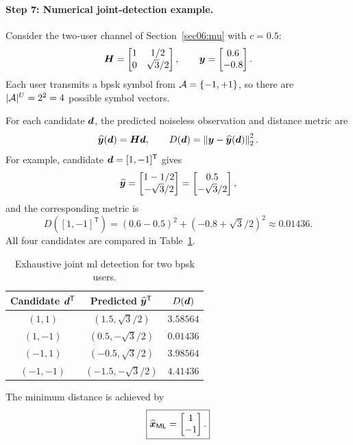 \paragraph{Step 7: Numerical joint-detection example.}
Consider the two-user channel of Section~\ref{sec06:mu} with $c=0.5$:
\begin{equation*}
	\bm{H}=
	\begin{bmatrix}
		1&1/2\\
		0&\sqrt3/2
	\end{bmatrix},
	\qquad
	\bm{y}=
	\begin{bmatrix}0.6\\-0.8\end{bmatrix}.
\end{equation*}
Each user transmits a \ac{bpsk} symbol from $\mathcal{A}=\{-1,+1\}$, so there are $|\mathcal{A}|^U=2^2=4$ possible symbol vectors.

For each candidate $\bm{d}$, the predicted noiseless observation and distance metric are
\begin{equation*}
	\widehat{\bm{y}}(\bm{d})=\bm{H}\bm{d},
	\qquad
	D(\bm{d})=\left\|\bm{y}-\widehat{\bm{y}}(\bm{d})\right\|_2^2.
\end{equation*}
For example, candidate $\bm{d}=[1,-1]^{\mathsf T}$ gives
\begin{equation*}
	\widehat{\bm{y}}=
	\begin{bmatrix}1-1/2\\-\sqrt3/2\end{bmatrix}
	=\begin{bmatrix}0.5\\-\sqrt3/2\end{bmatrix},
\end{equation*}
and the corresponding metric is
\begin{equation*}
	D([1,-1]^{\mathsf T})
	=(0.6-0.5)^2+(-0.8+\sqrt3/2)^2
	\approx0.01436.
\end{equation*}
All four candidates are compared in Table~\ref{tab06:ml-comparison}.
\begin{table}[htbp]
	\centering
	\caption{Exhaustive joint \ac{ml} detection for two \ac{bpsk} users.}
	\label{tab06:ml-comparison}
	\begin{tabular}{ccc}
		\toprule
		Candidate ${\bm{d}}^{\mathsf{T}}$ & Predicted ${\widehat{\bm{y}}}^{\mathsf{T}}$ & $D(\bm{d})$\\
		\midrule
		$(1,1)$ & $(1.5,\sqrt3/2)$ & $3.58564$\\
		$(1,-1)$ & $(0.5,-\sqrt3/2)$ & $0.01436$\\
		$(-1,1)$ & $(-0.5,\sqrt3/2)$ & $3.98564$\\
		$(-1,-1)$ & $(-1.5,-\sqrt3/2)$ & $4.41436$\\
		\bottomrule
	\end{tabular}
\end{table}
The minimum distance is achieved by
\begin{equation}
	\boxed{
		\widehat{\bm{x}}_{\mathsf{ML}}
		=\begin{bmatrix}1\\-1\end{bmatrix}.
	}
	\label{eq06:ml-example}
\end{equation}

